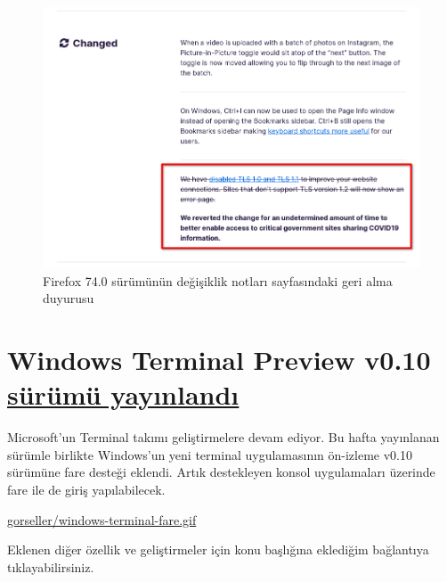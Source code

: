 \documentclass[11pt]{article}
\begin{document}
\begin{figure}[htbp]
\centering
\includegraphics[width=.9\linewidth]{gorseller/firefox-chrome-tls10-11.png}
\caption{Firefox 74.0 sürümünün değişiklik notları sayfasındaki geri alma duyurusu}
\end{figure}
\newpage
\section{Windows Terminal Preview v0.10 \href{https://devblogs.microsoft.com/commandline/windows-terminal-preview-v0-10-release/}{sürümü yayınlandı}}
\label{sec:org5c87889}
Microsoft'un Terminal takımı geliştirmelere devam ediyor. Bu hafta yayınlanan
sürümle birlikte Windows'un yeni terminal uygulamasının ön-izleme v0.10
sürümüne fare desteği eklendi. Artık destekleyen konsol uygulamaları üzerinde
fare ile de giriş yapılabilecek.

\url{gorseller/windows-terminal-fare.gif}

Eklenen diğer özellik ve geliştirmeler için konu başlığına eklediğim
bağlantıya tıklayabilirsiniz.
\end{document}
